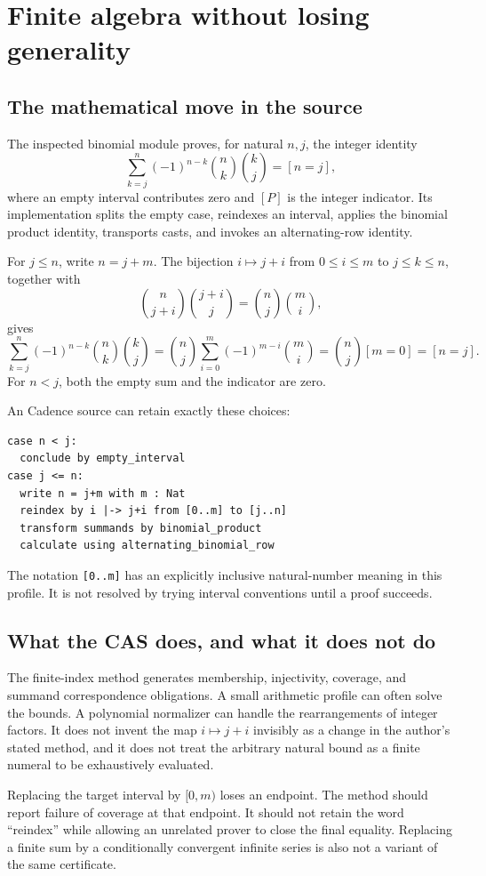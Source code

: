\documentclass[11pt,letterpaper]{article}
\newcommand{\code}[1]{\nolinkurl{#1}}
\theoremstyle{definition}
\begin{document}
\section{Finite algebra without losing generality}\label{sec:binomial}
\subsection{The mathematical move in the source}
The inspected binomial module proves, for natural \(n,j\), the integer identity
\[
 \sum_{k=j}^{n}(-1)^{n-k}\binom nk\binom kj=[n=j],
\]
where an empty interval contributes zero and \([P]\) is the integer indicator.
Its implementation splits the empty case, reindexes an interval, applies the
binomial product identity, transports casts, and invokes an alternating-row
identity\cite{pbinomial}.

For \(j\le n\), write \(n=j+m\). The bijection \(i\mapsto j+i\) from
\(0\le i\le m\) to \(j\le k\le n\), together with
\[
 \binom n{j+i}\binom{j+i}j=\binom nj\binom mi,
\]
gives
\[
 \sum_{k=j}^{n}(-1)^{n-k}\binom nk\binom kj
 =\binom nj\sum_{i=0}^{m}(-1)^{m-i}\binom mi
 =\binom nj[m=0]=[n=j].
\]
For \(n<j\), both the empty sum and the indicator are zero.

An Cadence source can retain exactly these choices:
\begin{lstlisting}
case n < j:
  conclude by empty_interval
case j <= n:
  write n = j+m with m : Nat
  reindex by i |-> j+i from [0..m] to [j..n]
  transform summands by binomial_product
  calculate using alternating_binomial_row
\end{lstlisting}
The notation \code{[0..m]} has an explicitly inclusive natural-number meaning in
this profile. It is not resolved by trying interval conventions until a proof
succeeds.

\subsection{What the CAS does, and what it does not do}
The finite-index method generates membership, injectivity, coverage, and summand
correspondence obligations. A small arithmetic profile can often solve the bounds.
A polynomial normalizer can handle the rearrangements of integer factors. It does
not invent the map \(i\mapsto j+i\) invisibly as a change in the author's stated
method, and it does not treat the arbitrary natural bound as a finite numeral to
be exhaustively evaluated.

Replacing the target interval by \([0,m)\) loses an endpoint. The method should
report failure of coverage at that endpoint. It should not retain the word
``reindex'' while allowing an unrelated prover to close the final equality.
Replacing a finite sum by a conditionally convergent infinite series is also not
a variant of the same certificate.
\end{document}
